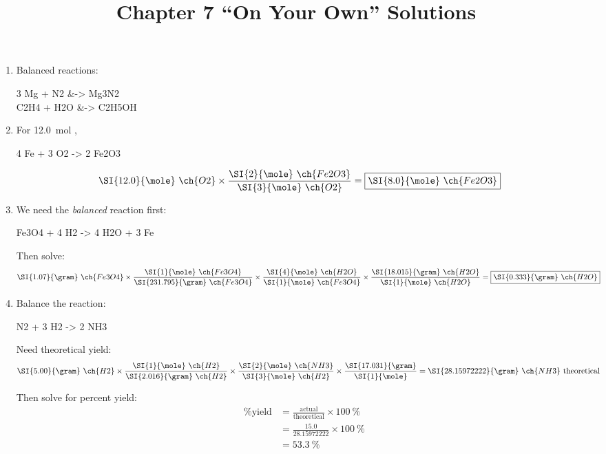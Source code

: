 \documentclass[11pt,letterpaper]{article}
\title{Chapter 7 ``On Your Own'' Solutions}
\begin{document}
\begin{center}
	\bfseries
	\Large
	\thetitle
\end{center}

\begin{enumerate}[itemsep=2em,leftmargin=0pt,label=\textbf{\Alph*.}]
	\item Balanced reactions:
		\begin{reactions*}
			3 Mg\sld{} + N2\gas{} &-> Mg3N2\sld{} \\
			C2H4\gas{} + H2O\lqd{} &-> C2H5OH\lqd{}
		\end{reactions*}
	\item For \SI{12.0}{\mole} ,
		\begin{reaction*}
			4 Fe\sld{} + 3 O2\gas{} -> 2 Fe2O3\sld{}
		\end{reaction*}
		\begin{align*}
			\SI{12.0}{\mole}~\ch{O2} \times
			\frac{\SI{2}{\mole}~\ch{Fe2O3}}{\SI{3}{\mole}~\ch{O2}}
			&= \boxed{\SI{8.0}{\mole}~\ch{Fe2O3}}
		\end{align*}
	\item We need the \emph{balanced} reaction first:
		\begin{reaction*}
			Fe3O4 + 4 H2 -> 4 H2O + 3 Fe
		\end{reaction*}

		Then solve:
		\begin{align*}
			\SI{1.07}{\gram}~\ch{Fe3O4} \times
			\frac{\SI{1}{\mole}~\ch{Fe3O4}}{\SI{231.795}{\gram}~\ch{Fe3O4}}
				\times
			\frac{\SI{4}{\mole}~\ch{H2O}}{\SI{1}{\mole}~\ch{Fe3O4}}
			\times
			\frac{\SI{18.015}{\gram}~\ch{H2O}}{\SI{1}{\mole}~\ch{H2O}}
			&= \boxed{\SI{0.333}{\gram}~\ch{H2O}}
		\end{align*}
	\item Balance the reaction:
		\begin{reaction*}
			N2\gas{} + 3 H2\gas{} -> 2 NH3\gas{}
		\end{reaction*}

		Need theoretical yield:
		\begin{align*}
			\SI{5.00}{\gram}~\ch{H2} \times
			\frac{\SI{1}{\mole}~\ch{H2}}{\SI{2.016}{\gram}~\ch{H2}}
			\times
			\frac{\SI{2}{\mole}~\ch{NH3}}{\SI{3}{\mole}~\ch{H2}}
			\times \frac{\SI{17.031}{\gram}}{\SI{1}{\mole}} &=
			\SI{28.15972222}{\gram}~\ch{NH3}~\text{theoretical}
		\end{align*}

		Then solve for percent yield:
		\begin{align*}
			\text{\% yield} &=
			\frac{\text{actual}}{\text{theoretical}} \times
			\SI{100}{\percent} \\
			&= \frac{15.0}{28.15972222} \times \SI{100}{\percent} \\
			&= \boxed{\SI{53.3}{\%}}
		\end{align*}


\end{enumerate}
\end{document}
